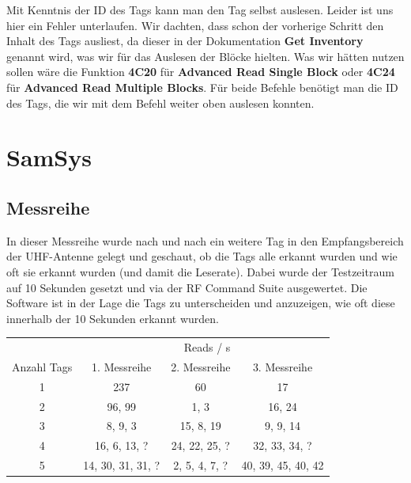 \documentclass[paper=a4,fontsize=11pt,headsepline,footsepline,parskip=half]{scrartcl}
\begin{document}
Mit Kenntnis der ID des Tags kann man den Tag selbst auslesen. Leider ist uns hier ein Fehler unterlaufen. Wir dachten, dass schon der vorherige
Schritt den Inhalt des Tags ausliest, da dieser in der Dokumentation \textbf{Get Inventory} genannt wird, was wir für das Auslesen der Blöcke hielten.
Was wir hätten nutzen sollen wäre die Funktion \textbf{4C20} für \textbf{Advanced Read Single Block} oder \textbf{4C24} für \textbf{Advanced Read Multiple Blocks}.
Für beide Befehle benötigt man die ID des Tags, die wir mit dem Befehl weiter oben auslesen konnten.

\section{SamSys}

\subsection{Messreihe}

In dieser Messreihe wurde nach und nach ein weitere Tag in den Empfangsbereich der UHF-Antenne gelegt und geschaut, ob die Tags alle erkannt wurden
und wie oft sie erkannt wurden (und damit die Leserate). Dabei wurde der Testzeitraum auf 10 Sekunden gesetzt und via der RF Command Suite
ausgewertet. Die Software ist in der Lage die Tags zu unterscheiden und anzuzeigen, wie oft diese innerhalb der 10 Sekunden erkannt wurden.

\begin{center}
\begin{tabular}{@{}cccc@{}}
\toprule
\multicolumn{3}{r}{Reads / s}\\
\cmidrule(lr){2-4}
  Anzahl Tags & 1. Messreihe & 2. Messreihe & 3. Messreihe\\
\midrule
 1 & 237 & 60 & 17\\
 2 & 96, 99 & 1, 3 & 16, 24\\
 3 & 8, 9, 3 & 15, 8, 19 & 9, 9, 14\\
 4 & 16, 6, 13, ? & 24, 22, 25, ? & 32, 33, 34, ?\\
 5 & 14, 30, 31, 31, ? & 2, 5, 4, 7, ? & 40, 39, 45, 40, 42\\
\bottomrule
\end{tabular}
\end{center}
\end{document}
